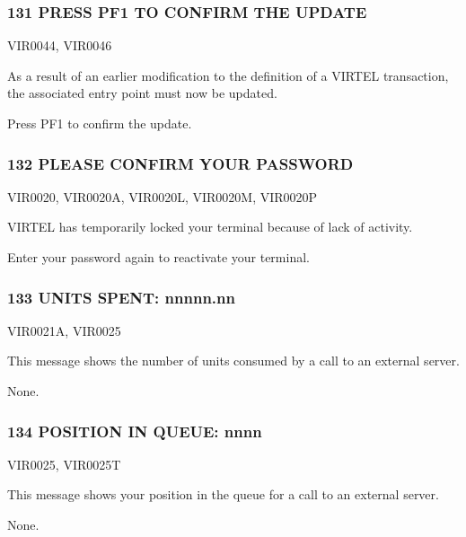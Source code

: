 \documentclass[letterpaper,10pt,english]{sphinxmanual}
\begin{document}
\subsubsection{131 PRESS PF1 TO CONFIRM THE UPDATE}
\label{\detokenize{messages:press-pf1-to-confirm-the-update}}\begin{description}
\sphinxAtStartPar
VIR0044, VIR0046

\sphinxAtStartPar
As a result of an earlier modification to the definition of a VIRTEL transaction, the associated entry point must now be updated.

\sphinxAtStartPar
Press PF1 to confirm the update.

\end{description}


\subsubsection{132 PLEASE CONFIRM YOUR PASSWORD}
\label{\detokenize{messages:please-confirm-your-password}}\begin{description}
\sphinxAtStartPar
VIR0020, VIR0020A, VIR0020L, VIR0020M, VIR0020P

\sphinxAtStartPar
VIRTEL has temporarily locked your terminal because of lack of activity.

\sphinxAtStartPar
Enter your password again to reactivate your terminal.

\end{description}


\subsubsection{133 UNITS SPENT: nnnnn.nn}
\label{\detokenize{messages:units-spent-nnnnn-nn}}\begin{description}
\sphinxAtStartPar
VIR0021A, VIR0025

\sphinxAtStartPar
This message shows the number of units consumed by a call to an external server.

\sphinxAtStartPar
None.

\end{description}


\subsubsection{134 POSITION IN QUEUE: nnnn}
\label{\detokenize{messages:position-in-queue-nnnn}}\begin{description}
\sphinxAtStartPar
VIR0025, VIR0025T

\sphinxAtStartPar
This message shows your position in the queue for a call to an external server.

\sphinxAtStartPar
None.

\end{description}
\end{document}
